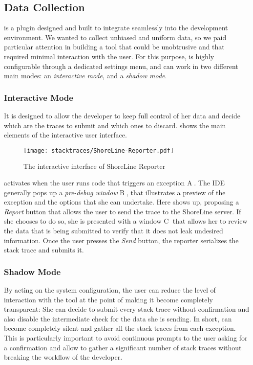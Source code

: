 \subsection{Data Collection}\label{sec:stacktraces-tool}

\slr is a plugin designed and built to integrate seamlessly into the \pha development environment.
We wanted to collect unbiased and uniform data, so we paid particular attention in building a tool that could be unobtrusive and that required minimal interaction with the user.
For this purpose, \slr is highly configurable through a dedicated settings menu, and can work in two different main modes: an \emph{interactive mode}, and a \emph{shadow mode}.

\subsubsection{Interactive Mode}
It is designed to allow the developer to keep full control of her data and decide which are the traces to submit and which ones to discard.
 shows the main elements of the interactive user interface.

\begin{figure}[ht]
\centering
  \texttt{[image: stacktraces/ShoreLine-Reporter.pdf]}
  \caption{The interactive interface of ShoreLine Reporter}
  \label{fig:shoreline-reporter}
\centering
\end{figure}

\slr activates when the user runs code that triggers an exception \textcircled{\scriptsize A}.
The \pha IDE generally pops up a \emph{pre-debug window} \textcircled{\scriptsize B}, that illustrates a preview of the exception and the options that she can undertake.
Here \slr shows up, proposing a \emph{Report} button that allows the user to send the trace to the ShoreLine server.
If she chooses to do so, she is presented with a window \textcircled{\scriptsize C} that allows her to review the data that is being submitted to verify that it does not leak undesired information.
Once the user presses the \emph{Send} button, the reporter serializes the stack trace and submits it.

\subsubsection{Shadow Mode}
By acting on the system configuration, the user can reduce the level of interaction with the tool at the point of making it become completely transparent: She can decide to submit every stack trace without confirmation and also disable the intermediate check for the data she is sending.
In short, \slr can become completely silent and gather all the stack traces from each exception.
This is particularly important to avoid continuous prompts to the user asking for a confirmation and allow \slr to gather a significant number of stack traces without breaking the workflow of the developer.


